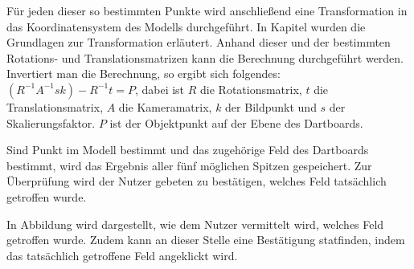 Für jeden dieser so bestimmten Punkte wird anschließend eine Transformation in das Koordinatensystem des Modells durchgeführt. In Kapitel  wurden die Grundlagen zur Transformation erläutert. Anhand dieser und der bestimmten Rotations- und Translationsmatrizen kann die Berechnung durchgeführt werden. Invertiert man die Berechnung, so ergibt sich folgendes: 
$(R^{-1}A^{-1}sk)-R^{-1}t=P$, dabei ist $R$ die Rotationsmatrix, $t$ die Translationsmatrix, $A$ die Kameramatrix, $k$ der Bildpunkt und $s$ der Skalierungsfaktor. $P$ ist der Objektpunkt auf der Ebene des Dartboards.

Sind Punkt im Modell bestimmt und das zugehörige Feld des Dartboards bestimmt, wird das Ergebnis aller fünf möglichen Spitzen gespeichert. Zur Überprüfung wird der Nutzer gebeten zu bestätigen, welches Feld tatsächlich getroffen wurde. 

In Abbildung  wird dargestellt, wie dem Nutzer vermittelt wird, welches Feld getroffen wurde. Zudem kann an dieser Stelle eine Bestätigung statfinden, indem das tatsächlich getroffene Feld angeklickt wird.


